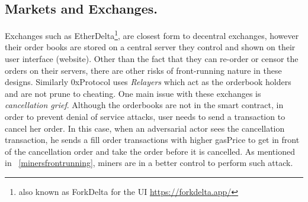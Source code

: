 

\subsection{Markets and Exchanges.} \label{sec:frontrunningExchanges}

Exchanges such as EtherDelta\footnote{also known as ForkDelta for the UI \url{https://forkdelta.app/}}, are closest form to decentral exchanges, however their order books are stored on a central server they control and shown on their user interface (website). Other than the fact that they can re-order or censor the orders on their servers, there are other risks of front-running nature in these designs. Similarly 0xProtocol uses \textit{Relayers} which act as the orderbook holders and are not prune to cheating. One main issue with these exchanges is \textit{cancellation grief}. Although the orderbooks are not in the smart contract, in order to prevent denial of service attacks, user needs to send a transaction to cancel her order. In this case, when an adversarial actor sees the cancellation transaction, he sends a fill order transactions with higher gasPrice to get in front of the cancellation order and take the order before it is cancelled. As mentioned in ~\ref{minersfrontrunning}, miners are in a better control to perform such attack. 


